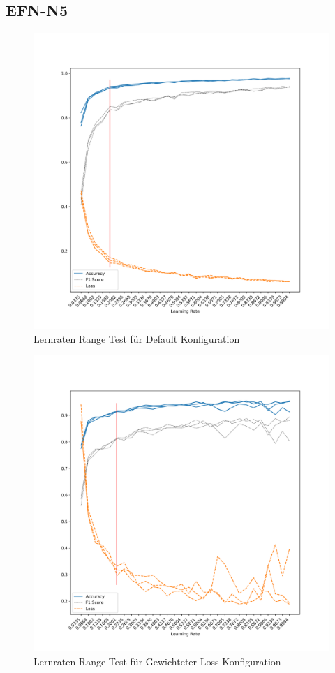 \subsection*{EFN-N5}
\begin{figure}[H]
    \centering
    \includegraphics[height=0.45\textheight]{figures/appendix/lr_default}
    \caption{Lernraten Range Test für Default Konfiguration}
    \label{fig:apx:lr_default}
\end{figure}
\begin{figure}[H]
    \centering
    \includegraphics[height=0.45\textheight]{figures/appendix/lr_weighted}
    \caption{Lernraten Range Test für Gewichteter Loss Konfiguration}
    \label{fig:apx:lr_weighted}
\end{figure}
